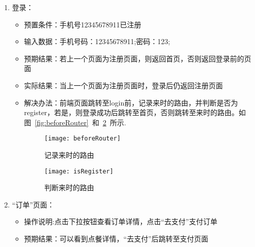 \begin{enumerate}
\begin{itemize}
        \item {实际结果}：如图~\ref{fig:existingTel}~所示.
              \begin{figure}[htbp]
                  \centering
                  \texttt{[image: existingTel]}
                  \caption{重复注册图}\label{fig:existingTel}
              \end{figure}
    \end{itemize}
    \item {登录}：
          \begin{itemize}
              \item{预置条件}：手机号12345678911已注册
              \item{输入数据}：手机号码：12345678911;密码：123;
              \item{预期结果}：若上一个页面为注册页面，则返回首页，否则返回登录前的页面
              \item{实际结果}：当上一个页面为注册页面时，登录后仍返回注册页面
              \item{解决办法}：前端页面跳转至login前，记录来时的路由，并判断是否为register，若是，则登录成功后跳转至首页，否则跳转至来时的路由。如图~\ref{fig:beforeRouter}~和~\ref{fig:isRegister}~所示.
              \begin{figure}[htbp]
                  \centering
                  \begin{minipage}{0.4\textwidth}
                      \centering
                      \texttt{[image: beforeRouter]}
                      \caption{记录来时的路由}\label{fig:beforeRouter}
                  \end{minipage}
                  \begin{minipage}{0.4\textwidth}
                      \centering
                      \texttt{[image: isRegister]}
                      \caption{判断来时的路由}\label{fig:isRegister}
                  \end{minipage}                 
              \end{figure}
          \end{itemize}
    \item {“订单”页面}：
          \begin{itemize}
              \item{操作说明}:点击下拉按钮查看订单详情，点击“去支付”支付订单
              \item {预期结果}：可以看到点餐详情，“去支付”后跳转至支付页面

\end{itemize}
\end{enumerate}
